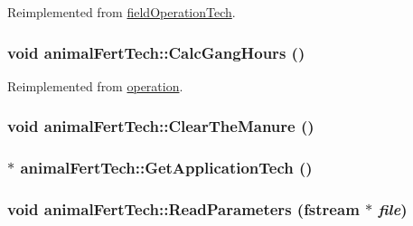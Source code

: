 Reimplemented from \hyperlink{classfield_operation_tech_a530d49b4cf06668121b80eba679b7e98}{fieldOperationTech}.\hypertarget{classanimal_fert_tech_a44124a413ec4871546323878c2782380}{
\subsubsection[{CalcGangHours}]{\setlength{\rightskip}{0pt plus 5cm}void animalFertTech::CalcGangHours ()}}
\label{classanimal_fert_tech_a44124a413ec4871546323878c2782380}


Reimplemented from \hyperlink{classoperation_a51c5612f29519bc82050ffccf089bc07}{operation}.\hypertarget{classanimal_fert_tech_ad39aff03d336eaa172e7a6e272368165}{
\subsubsection[{ClearTheManure}]{\setlength{\rightskip}{0pt plus 5cm}void animalFertTech::ClearTheManure ()}}
\label{classanimal_fert_tech_ad39aff03d336eaa172e7a6e272368165}
\hypertarget{classanimal_fert_tech_a41b5b0183a8047217d79a6bf5c779545}{
\subsubsection[{GetApplicationTech}]{ $\ast$ animalFertTech::GetApplicationTech ()}}
\label{classanimal_fert_tech_a41b5b0183a8047217d79a6bf5c779545}
\hypertarget{classanimal_fert_tech_ace0ed6c38236d05cd521f98624431767}{
\subsubsection[{ReadParameters}]{\setlength{\rightskip}{0pt plus 5cm}void animalFertTech::ReadParameters (fstream $\ast$ {\em file})}}
\label{classanimal_fert_tech_ace0ed6c38236d05cd521f98624431767}


